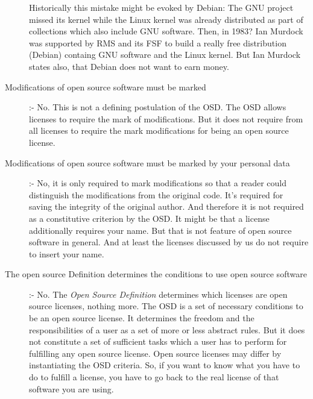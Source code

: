 \begin{description}
  Historically this mistake might be evoked by Debian: The GNU project missed
  its kernel while the Linux kernel was already distributed as part of
  collections which also include GNU software. Then, in 1983? Ian Murdock was
  supported by RMS and its FSF to build a really free distribution (Debian)
  containg GNU software and the Linux kernel. But Ian Murdock states also, that
  Debian does not want to earn money.
  \item[Modifications of open source software must be marked] :- No. This is not
  a defining postulation of the OSD. The OSD allows licenses to require the mark
  of modifications. But it does not require from all licenses to require the mark
  modifications for being an open source license.
  \item[Modifications of open source software must be marked by your personal
  data] :- No, it is only required to mark modifications so that a reader could
  distinguish the modifications from the original code. It's required for saving
  the integrity of the original author. And therefore it is not required as a
  constitutive criterion by the OSD. It might be that a license additionally
  requires your name. But that is not feature of open source software in general.
  And at least the licenses discussed by us do not require to insert your name.
  \item[The open source Definition determines the conditions to use open source
  software] :- No. The \emph{Open Source Definition} determines which licenses
  are open source licenses, nothing more. The OSD is a set of necessary
  conditions to be an open source license. It determines the freedom and the
  responsibilities of a user as a set of more or less abstract rules. But it
  does not constitute a set of sufficient tasks which a user has to perform for
  fulfilling any open source license. Open source licenses may differ by
  instantiating the OSD criteria. So, if you want to know what you have to do to
  fulfill a license, you have to go back to the real license of that software
  you are using.
\end{description}

%

